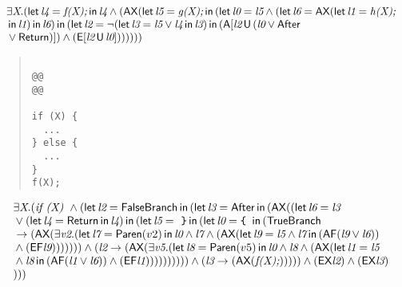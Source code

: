 \documentclass{article}
\newcommand{\U}{\,\mbox{\sf{U}}\,}
\newcommand{\A}{\mbox{\sf{A}}}
\newcommand{\E}{\mbox{\sf{E}}}
\newcommand{\AX}{\mbox{\sf{AX}}}
\newcommand{\EX}{\mbox{\sf{EX}}}
\newcommand{\AF}{\mbox{\sf{AF}}}
\newcommand{\EF}{\mbox{\sf{EF}}}
\newcommand{\mita}[1]{\mbox{\it{{#1}}}}
\newcommand{\msf}[1]{\mbox{\sf{{#1}}}}
\newcommand{\ttlb}{\mbox{\tt \char'173}}
\newcommand{\ttrb}{\mbox{\tt \char'175}}
\begin{document}
\[\begin{array}{l}
\exists \mita{X} . (\mita{\sf{let}} \, \mita{l4} = \mita{f(X);} \, \mita{\sf{in}} \, \mita{l4} \wedge (\AX(\mita{\sf{let}} \, \mita{l5} = \mita{g(X);} \, \mita{\sf{in}} \, (\mita{\sf{let}} \, \mita{l0} = \mita{l5} \wedge (\mita{\sf{let}} \, \mita{l6} = \AX(\mita{\sf{let}} \, \mita{l1} = \mita{h(X);}\\\mbox{} \, \mita{\sf{in}} \, \mita{l1}
) \, \mita{\sf{in}} \, \mita{l6}
) \, \mita{\sf{in}} \, (\mita{\sf{let}} \, \mita{l2} = \neg (\mita{\sf{let}} \, \mita{l3} = \mita{l5} \vee \mita{l4} \, \mita{\sf{in}} \, \mita{l3}
) \, \mita{\sf{in}} \, (\A[\mita{l2} \U (\mita{l0} \vee \msf{After}\\\mbox{} \vee \msf{Return})]
) \wedge (\E[\mita{l2} \U \mita{l0}]
)
)
)
))
)
\end{array}\]

\begin{quote}\begin{verbatim}

@@
@@

if (X) {
  ...
} else {
  ...
}
f(X);
\end{verbatim}\end{quote}

\[\begin{array}{l}
\exists \mita{X} . (\mita{if (X) } \wedge (\mita{\sf{let}} \, \mita{l2} = \msf{FalseBranch} \, \mita{\sf{in}} \, (\mita{\sf{let}} \, \mita{l3} = \msf{After} \, \mita{\sf{in}} \, (\AX((\mita{\sf{let}} \, \mita{l6} = \mita{l3}\\\mbox{} \vee (\mita{\sf{let}} \, \mita{l4} = \msf{Return} \, \mita{\sf{in}} \, \mita{l4}
) \, \mita{\sf{in}} \, (\mita{\sf{let}} \, \mita{l5} = \mita{
{\ttrb}} \, \mita{\sf{in}} \, (\mita{\sf{let}} \, \mita{l0} = \mita{{\ttlb}
  } \, \mita{\sf{in}} \, (\msf{TrueBranch}\\\mbox{} \rightarrow (\AX(\exists \mita{v2} . (\mita{\sf{let}} \, \mita{l7} = \msf{Paren}(v2) \, \mita{\sf{in}} \, \mita{l0} \wedge \mita{l7} \wedge (\AX(\mita{\sf{let}} \, \mita{l9} = \mita{l5} \wedge \mita{l7} \, \mita{\sf{in}} \, (\AF(\mita{l9} \vee \mita{l6}))\\\mbox{} \wedge (\EF\mita{l9})
))
)))) \wedge (\mita{l2} \rightarrow (\AX(\exists \mita{v5} . (\mita{\sf{let}} \, \mita{l8} = \msf{Paren}(v5) \, \mita{\sf{in}} \, \mita{l0} \wedge \mita{l8} \wedge (\AX(\mita{\sf{let}} \, \mita{l1} = \mita{l5}\\\mbox{} \wedge \mita{l8} \, \mita{\sf{in}} \, (\AF(\mita{l1} \vee \mita{l6})) \wedge (\EF\mita{l1})
))
))))
)
)
) \wedge (\mita{l3} \rightarrow (\AX(\mita{f(X);}))))) \wedge (\EX\mita{l2}) \wedge (\EX\mita{l3})\\\mbox{}
)
))
\end{array}\]
\end{document}
